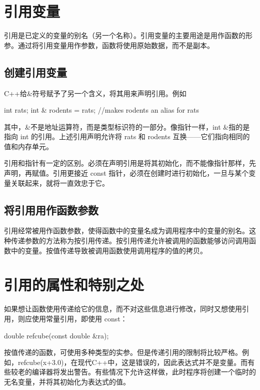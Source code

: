 \section{引用变量}
引用是已定义的变量的别名（另一个名称）。引用变量的主要用途是用作函数的形参。通过将引用变量用作参数，函数将使用原始数据，而不是副本。
\subsection{创建引用变量}
C++给\&符号赋予了另一个含义，将其用来声明引用。例如
\begin{ccode}
int rats;
int & rodents = rats; //makes rodents an alias for rats
\end{ccode}
其中，\&不是地址运算符，而是类型标识符的一部分。像指针一样，int \&指的是指向 int 的引用。上述引用声明允许将 rats 和 rodents 互换——它们指向相同的值和内存单元。

{\color{red}引用和指针有一定的区别。必须在声明引用是将其初始化，而不能像指针那样，先声明，再赋值。引用更接近 const 指针，必须在创建时进行初始化，一旦与某个变量关联起来，就将一直效忠于它。}
\subsection{将引用用作函数参数}
引用经常被用作函数参数，使得函数中的变量名成为调用程序中的变量的别名。这种传递参数的方法称为按引用传递。按引用传递允许被调用的函数能够访问调用函数中的变量。按值传递导致被调用函数使用调用程序的值的拷贝。
\section{引用的属性和特别之处}
如果想让函数使用传递给它的信息，而不对这些信息进行修改，同时又想使用引用，则应使用常量引用，即使用 const：
\begin{ccode}
double refcube(const double &ra);
\end{ccode}

按值传递的函数，可使用多种类型的实参。但是传递引用的限制将比较严格。例如，refcube(x+3.0)，在现代C++中，这是错误的，因此表达式并不是变量。而有些较老的编译器将发出警告。有些情况下允许这样做，此时程序将创建一个临时的无名变量，并将其初始化为表达式的值。

